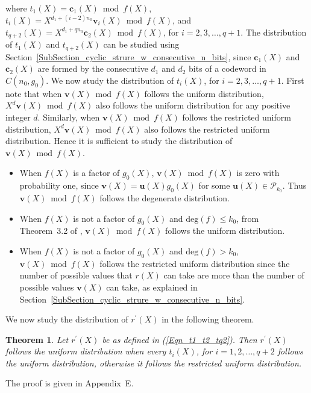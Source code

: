 \documentclass[10pt,journal]{IEEEtran}
\newtheorem{theorem}{Theorem}
\def \deg{{\mathrm{deg}}}
\begin{document}
% 
where $t_1(X) = \mathbf{c}_1(X) \bmod f(X)$, $t_i(X) = X^{d_1+(i-2)n_0} \mathbf{v}_{i}(X) \bmod f(X)$, and
$t_{q+2}(X) = X^{d_1+qn_0} \mathbf{c}_2(X) \bmod f(X)$, for $i = 2,3,\ldots, q+1$.
% 
The distribution of $t_1(X)$ and $t_{q+2}(X)$ can be studied using Section~\ref{SubSection_cyclic_strure_w_consecutive_n_bits},
since $\mathbf{c}_1(X)$ and $\mathbf{c}_2(X)$ are formed by the consecutive $d_1$ and $d_2$ bits of a codeword in $C(n_0,g_0)$.
We now study the distribution of $t_i(X)$, for $i = 2,3,\ldots, q+1$.
First note that when $\mathbf{v}(X) \bmod f(X)$ follows the uniform distribution, 
$X^d \mathbf{v}(X) \bmod f(X)$ also follows the uniform distribution for any positive integer $d$.
Similarly, when $\mathbf{v}(X) \bmod f(X)$ follows the restricted uniform distribution, 
$X^d \mathbf{v}(X) \bmod f(X)$ also follows the restricted uniform distribution.
Hence it is sufficient to study the distribution of $\mathbf{v}(X) \bmod f(X)$.
% 
\begin{itemize}
%  
\item When $f(X)$ is a factor of $g_0(X)$, $\mathbf{v}(X) \bmod f(X)$ is zero with probability one,
since $\mathbf{v}(X) = \mathbf{u}(X) g_0(X)$ for some $\mathbf{u}(X) \in \mathcal{P}_{k_0}$.
Thus $\mathbf{v}(X) \bmod f(X)$ follows the degenerate distribution.
% 
\item When $f(X)$ is not a factor of $g_0(X)$ and $\deg(f) \leq k_0$, from Theorem~3.2 of \cite{EuropeanWireless2014},
$\mathbf{v}(X) \bmod f(X)$ follows the uniform distribution.
% 
\item When $f(X)$ is not a factor of $g_0(X)$ and $\deg(f) > k_0$, $\mathbf{v}(X) \bmod f(X)$ follows the restricted uniform distribution 
since the number of possible values that $r(X)$ can take are more than the number of possible values $\mathbf{v}(X)$
can take, as explained in Section~\ref{SubSection_cyclic_strure_w_consecutive_n_bits}.
% 
\end{itemize}
% 
We now study the distribution of $r^{\prime}(X)$ in the following theorem.

\begin{theorem}
\label{Theorem_structure_w_prime_type3}
%  
Let $r^{\prime}(X)$ be as defined in (\ref{Eqn_t1_t2_tq2}).
Then $r^{\prime}(X)$ follows the uniform distribution when every $t_i(X)$, for $i = 1,2,\ldots,q+2$
follows the uniform distribution, otherwise it follows the restricted uniform distribution.
% 
\end{theorem}
% 
\begin{IEEEproof}
%  
The proof is given in Appendix~E. 
% 
\end{IEEEproof}
% 
\end{document}

